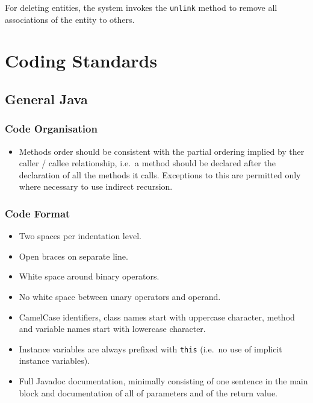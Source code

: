 \documentclass[a4paper,fleqn]{article}
\newcommand{\computercode}[1]{\texttt{#1}}
\begin{document}
For deleting entities, the system invokes the \computercode{unlink}
method to remove all associations of the entity to others.

\section{Coding Standards}


\subsection{General Java}

\subsubsection{Code Organisation}

\begin{itemize}

\item Methods order should be consistent with the partial ordering
  implied by ther caller / callee relationship, i.e.\ a method should
  be declared after the declaration of all the methods it
  calls. Exceptions to this are permitted only where necessary to use
  indirect recursion.

\end{itemize}


\subsubsection{Code Format}

\begin{itemize}

\item Two spaces per indentation level.

\item Open braces on separate line.

\item White space around binary operators.

\item No white space between unary operators and operand.

\item CamelCase identifiers, class names start with uppercase
  character, method and variable names start with lowercase character.

\item Instance variables are always prefixed with \computercode{this}
  (i.e.\ no use of implicit instance variables).

\item Full Javadoc documentation, minimally consisting of one sentence
  in the main block and documentation of all of parameters and of the
  return value.

\end{itemize}
\end{document}
